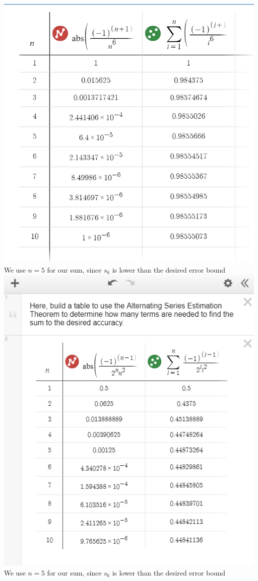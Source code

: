 \documentclass[12pt]{article}
\begin{document}
\includegraphics[width=\linewidth]{11_5_23}
We use $n=5$ for our sum, since $s_6$ is lower than the desired error bound
\includegraphics[width=\linewidth]{11_5_25}
We use $n=5$ for our sum, since $s_6$ is lower than the desired error bound 
\end{document}
